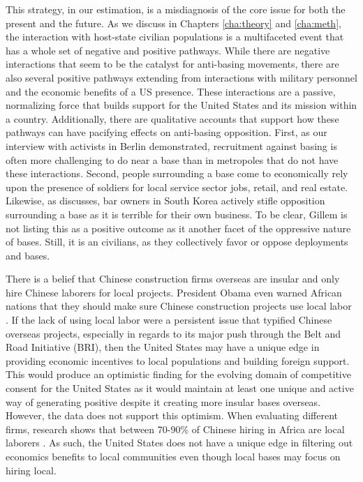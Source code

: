 This strategy, in our estimation, is a misdiagnosis of the core issue for both the present and the future. As we discuss in Chapters \ref{cha:theory} and \ref{cha:meth}, the interaction with host-state civilian populations is a multifaceted event that has a whole set of negative and positive pathways. While there are negative interactions that seem to be the catalyst for anti-basing movements, there are also several positive pathways extending from interactions with military personnel and the economic benefits of a US presence. These interactions are a passive, normalizing force that builds support for the United States and its mission within a country. Additionally, there are qualitative accounts that support how these pathways can have pacifying effects on anti-basing opposition. First, as our interview with activists in Berlin demonstrated, recruitment against basing is often more challenging to do near a base than in metropoles that do not have these interactions. Second, people surrounding a base come to economically rely upon the presence of soldiers for local service sector jobs, retail, and real estate. Likewise, as  discusses, bar owners in South Korea actively stifle opposition surrounding a base as it is terrible for their own business. To be clear, Gillem is not listing this as a positive outcome as it another facet of the oppressive nature of bases. Still, it is an civilians, as they collectively favor or oppose deployments and bases.

There is a belief that Chinese construction firms overseas are insular and only hire Chinese laborers for local projects. President Obama even warned African nations that they should make sure Chinese construction projects use local labor \cite{economist2014}. If the lack of using local labor were a persistent issue that typified Chinese overseas projects, especially in regards to its major push through the Belt and Road Initiative (BRI), then the United States may have a unique edge in providing economic incentives to local populations and building foreign support. This would produce an optimistic finding for the evolving domain of competitive consent for the United States as it would maintain at least one unique and active way of generating positive despite it creating more insular bases overseas.  However, the data does not support this optimism.  When evaluating different firms, research shows that between 70-90\% of Chinese hiring in Africa are local laborers \cite{Chiyemura2021}. As such, the United States does not have a unique edge in filtering out economics benefits to local communities even though local bases may focus on hiring local. 

